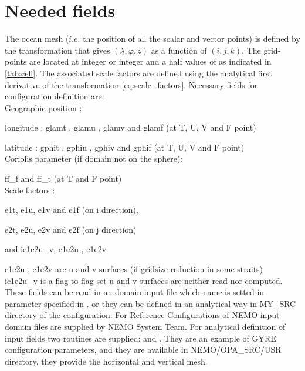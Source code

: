 \documentclass[../tex_main/NEMO_manual]{subfiles}
\begin{document}
\section{Needed fields}
\label{sec:DOM_fields}
The ocean mesh ($i.e.$ the position of all the scalar and vector points) is defined 
by the transformation that gives $(\lambda,\varphi,z)$ as a function of $(i,j,k)$. 
The grid-points are located at integer or integer and a half values of as indicated 
in \autoref{tab:cell}. The associated scale factors are defined using the  
analytical first derivative of the transformation \autoref{eq:scale_factors}. 
Necessary fields for configuration definition are: \\
Geographic position :

longitude : glamt , glamu , glamv and glamf  (at T, U, V and F point)

latitude : gphit , gphiu , gphiv and gphif (at T, U, V and F point)\\
Coriolis parameter (if domain not on the sphere): 

 ff\_f  and  ff\_t (at T and F point)\\
Scale factors : 
 
 e1t, e1u, e1v and e1f (on i direction),

 e2t, e2u, e2v and e2f (on j direction)

 and ie1e2u\_v, e1e2u , e1e2v   
 
e1e2u , e1e2v are u and v surfaces (if gridsize reduction in some straits)\\
ie1e2u\_v is a flag to flag set u and  v surfaces are neither read nor computed.\\
 
These fields can be read in an domain input file which name is setted in  parameter specified in .
or they can be defined in an analytical way in MY\_SRC directory of the configuration.
For Reference Configurations of NEMO input domain files are supplied by NEMO System Team. For analytical definition of input fields two routines are supplied:  and . They are an example of GYRE configuration parameters, and they are available in NEMO/OPA\_SRC/USR directory, they provide the horizontal and vertical mesh. 
\end{document}
